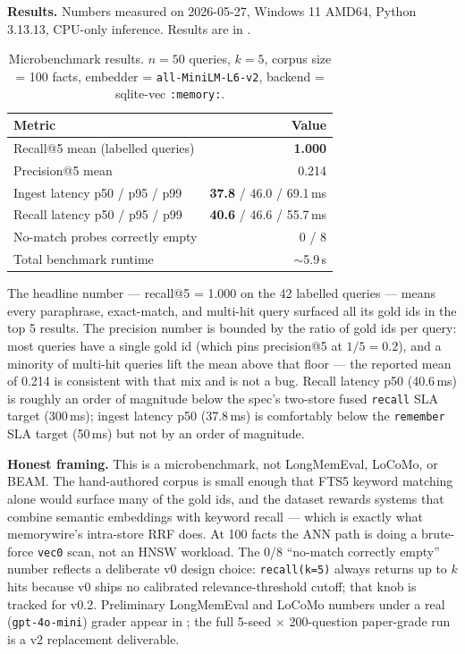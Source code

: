 \documentclass[11pt,letterpaper,twocolumn]{article}
\begin{document}
\textbf{Results.} Numbers measured on 2026-05-27, Windows 11 AMD64, Python 3.13.13, CPU-only inference. Results are in .

\begin{table}[t]
\centering
\caption{Microbenchmark results. $n=50$ queries, $k=5$, corpus size = 100 facts, embedder = \texttt{all-MiniLM-L6-v2}, backend = sqlite-vec \texttt{:memory:}.}
\label{tab:microbench}
\small
\begin{tabular}{lr}
\toprule
\textbf{Metric} & \textbf{Value} \\
\midrule
Recall@5 mean (labelled queries) & \textbf{1.000} \\
Precision@5 mean & 0.214 \\
Ingest latency p50 / p95 / p99 & \textbf{37.8} / 46.0 / 69.1\,ms \\
Recall latency p50 / p95 / p99 & \textbf{40.6} / 46.6 / 55.7\,ms \\
No-match probes correctly empty & 0 / 8 \\
Total benchmark runtime & $\sim$5.9\,s \\
\bottomrule
\end{tabular}
\end{table}

The headline number --- recall@5 = 1.000 on the 42 labelled queries --- means every paraphrase, exact-match, and multi-hit query surfaced all its gold ids in the top 5 results. The precision number is bounded by the ratio of gold ids per query: most queries have a single gold id (which pins precision@5 at $1/5 = 0.2$), and a minority of multi-hit queries lift the mean above that floor --- the reported mean of 0.214 is consistent with that mix and is not a bug. Recall latency p50 (40.6\,ms) is roughly an order of magnitude below the spec's two-store fused \texttt{recall} SLA target (300\,ms); ingest latency p50 (37.8\,ms) is comfortably below the \texttt{remember} SLA target (50\,ms) but not by an order of magnitude.

\textbf{Honest framing.} This is a microbenchmark, not LongMemEval, LoCoMo, or BEAM. The hand-authored corpus is small enough that FTS5 keyword matching alone would surface many of the gold ids, and the dataset rewards systems that combine semantic embeddings with keyword recall --- which is exactly what memorywire's intra-store RRF does. At 100 facts the ANN path is doing a brute-force \texttt{vec0} scan, not an HNSW workload. The 0/8 ``no-match correctly empty'' number reflects a deliberate v0 design choice: \texttt{recall(k=5)} always returns up to $k$ hits because v0 ships no calibrated relevance-threshold cutoff; that knob is tracked for v0.2. Preliminary LongMemEval and LoCoMo numbers under a real (\texttt{gpt-4o-mini}) grader appear in ; the full 5-seed $\times$ 200-question paper-grade run is a v2 replacement deliverable.
\end{document}
